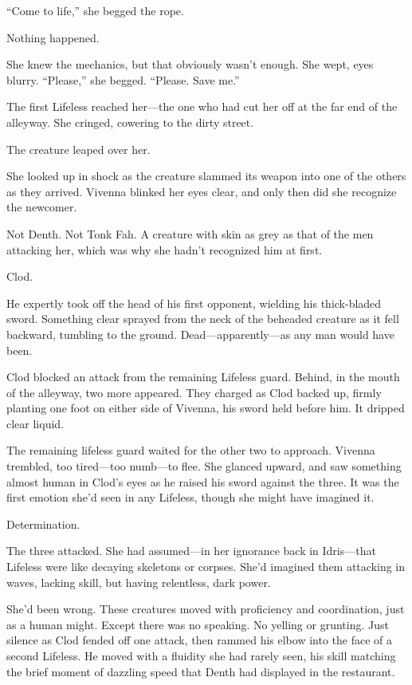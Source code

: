 “Come to life,” she begged the rope.

Nothing happened.

She knew the mechanics, but that obviously wasn’t enough. She wept, eyes blurry. “Please,” she begged. “Please. Save me.”

The first Lifeless reached her—the one who had cut her off at the far end of the alleyway. She cringed, cowering to the dirty street.

The creature leaped over her.

She looked up in shock as the creature slammed its weapon into one of the others as they arrived. Vivenna blinked her eyes clear, and only then did she recognize the newcomer.

Not Denth. Not Tonk Fah. A creature with skin as grey as that of the men attacking her, which was why she hadn’t recognized him at first.

Clod.

He expertly took off the head of his first opponent, wielding his thick-bladed sword. Something clear sprayed from the neck of the beheaded creature as it fell backward, tumbling to the ground. Dead—apparently—as any man would have been.

Clod blocked an attack from the remaining Lifeless guard. Behind, in the mouth of the alleyway, two more appeared. They charged as Clod backed up, firmly planting one foot on either side of Vivenna, his sword held before him. It dripped clear liquid.

The remaining lifeless guard waited for the other two to approach. Vivenna trembled, too tired—too numb—to flee. She glanced upward, and saw something almost human in Clod’s eyes as he raised his sword against the three. It was the first emotion she’d seen in any Lifeless, though she might have imagined it.

Determination.

The three attacked. She had assumed—in her ignorance back in Idris—that Lifeless were like decaying skeletons or corpses. She’d imagined them attacking in waves, lacking skill, but having relentless, dark power.

She’d been wrong. These creatures moved with proficiency and coordination, just as a human might. Except there was no speaking. No yelling or grunting. Just silence as Clod fended off one attack, then rammed his elbow into the face of a second Lifeless. He moved with a fluidity she had rarely seen, his skill matching the brief moment of dazzling speed that Denth had displayed in the restaurant.

